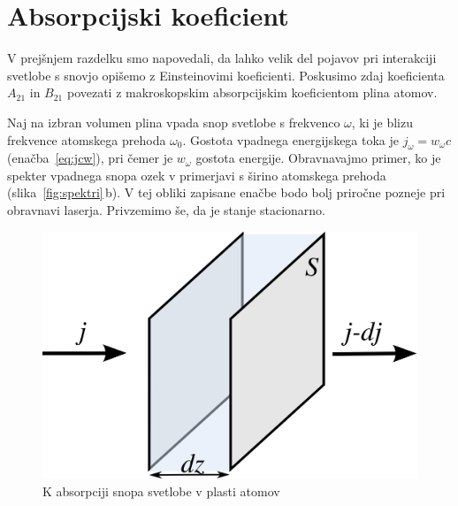\section{Absorpcijski koeficient}

V prejšnjem razdelku smo napovedali, da lahko velik del pojavov pri interakciji 
svetlobe s snovjo opišemo z Einsteinovimi koeficienti. Poskusimo zdaj 
koeficienta $A_{21}$ in $B_{21}$ povezati z makroskopskim absorpcijskim
koeficientom plina atomov. 


Naj na izbran volumen plina vpada snop svetlobe s frekvenco
$\omega$, ki je blizu frekvence atomskega prehoda $\omega_{0}$. Gostota
vpadnega energijskega toka je $j_{\omega}=w_{\omega}c$ (enačba~\ref{eq:jcw}), 
pri čemer je $w_{\omega}$ gostota energije. Obravnavajmo primer, ko je 
spekter vpadnega snopa ozek v primerjavi s širino atomskega prehoda
(slika~\ref{fig:spektri}\,b). V tej obliki zapisane enačbe bodo bolj 
priročne pozneje pri obravnavi laserja. Privzemimo še, da
je stanje stacionarno. 
\begin{figure}[h]
\centering
\includegraphics[width=6truecm]{slike/05_Absorpcija.png}
\caption{K absorpciji snopa svetlobe v plasti atomov}
\label{fig:abs}
\end{figure}

